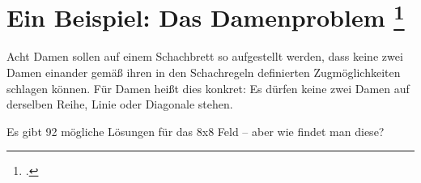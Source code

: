 \documentclass{lehramt-informatik-aufgabe}
\begin{document}

\section{Ein Beispiel: Das Damenproblem
\footcite[Seite 18 - 19 (PDF 15-19)]{aud:fs:3}}

Acht Damen sollen auf einem Schachbrett so aufgestellt werden, dass
keine zwei Damen einander gemäß ihren in den Schachregeln definierten
Zugmöglichkeiten schlagen können. Für Damen heißt dies konkret: Es
dürfen keine zwei Damen auf derselben Reihe, Linie oder Diagonale
stehen.

Es gibt 92 mögliche Lösungen für das 8x8 Feld – aber wie findet man
diese?

\end{document}

